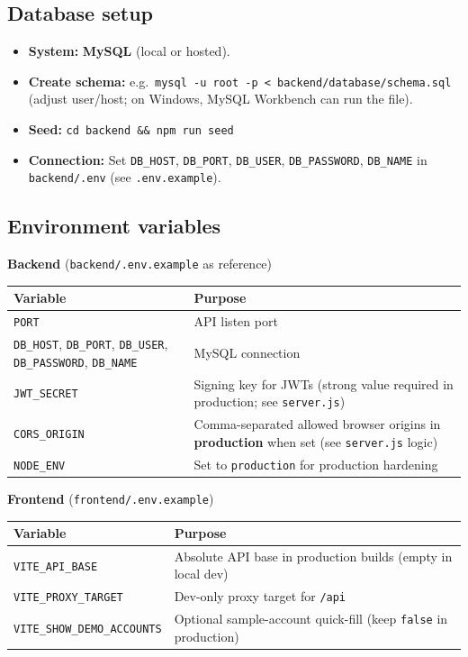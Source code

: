 \documentclass[11pt,letterpaper]{article}
\begin{document}
\subsection{Database setup}
\begin{itemize}[nosep]
  \item \textbf{System:} \textbf{MySQL} (local or hosted).
  \item \textbf{Create schema:} e.g.\ \texttt{mysql -u root -p < backend/database/schema.sql} (adjust user/host; on Windows, MySQL Workbench can run the file).
  \item \textbf{Seed:} \texttt{cd backend \&\& npm run seed}
  \item \textbf{Connection:} Set \texttt{DB\_HOST}, \texttt{DB\_PORT}, \texttt{DB\_USER}, \texttt{DB\_PASSWORD}, \texttt{DB\_NAME} in \texttt{backend/.env} (see \texttt{.env.example}).
\end{itemize}

\subsection{Environment variables}
\textbf{Backend} (\texttt{backend/.env.example} as reference)

\begin{longtable}{@{}p{2.4in}p{3.9in}@{}}
  \toprule
  \textbf{Variable} & \textbf{Purpose} \\
  \midrule
  \endhead
  \texttt{PORT} & API listen port \\
  \texttt{DB\_HOST}, \texttt{DB\_PORT}, \texttt{DB\_USER}, \texttt{DB\_PASSWORD}, \texttt{DB\_NAME} & MySQL connection \\
  \texttt{JWT\_SECRET} & Signing key for JWTs (strong value required in production; see \texttt{server.js}) \\
  \texttt{CORS\_ORIGIN} & Comma-separated allowed browser origins in \textbf{production} when set (see \texttt{server.js} logic) \\
  \texttt{NODE\_ENV} & Set to \texttt{production} for production hardening \\
  \bottomrule
\end{longtable}

\textbf{Frontend} (\texttt{frontend/.env.example})

\begin{longtable}{@{}p{2.4in}p{3.9in}@{}}
  \toprule
  \textbf{Variable} & \textbf{Purpose} \\
  \midrule
  \endhead
  \texttt{VITE\_API\_BASE} & Absolute API base in production builds (empty in local dev) \\
  \texttt{VITE\_PROXY\_TARGET} & Dev-only proxy target for \texttt{/api} \\
  \texttt{VITE\_SHOW\_DEMO\_ACCOUNTS} & Optional sample-account quick-fill (keep \texttt{false} in production) \\
  \bottomrule
\end{longtable}
\end{document}
